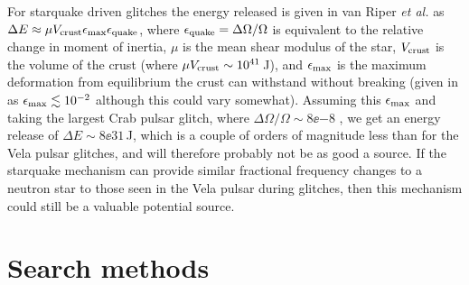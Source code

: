 For starquake driven glitches the energy released is given in van Riper {\it et al.}
\cite{vanRiper:1991} as $\Delta{}E \approx \mu{}V_{\rm crust}\epsilon_{\rm max}\epsilon_{\rm
quake}$, where $\epsilon_{\rm quake} = \Delta\Omega/\Omega$ is equivalent to the relative change in
moment of inertia, $\mu$ is the mean shear modulus of the star, $V_{\rm crust}$ is the volume of the
crust (where $\mu{}V_{\rm crust} \sim 10^{41}$\,J), and $\epsilon_{\rm max}$ is the maximum
deformation from equilibrium the crust can withstand without breaking (given in \cite{vanRiper:1991}
as $\epsilon_{\rm max} \lesssim 10^{-2}$ although this could vary somewhat). Assuming this
$\epsilon_{\rm max}$ and taking the largest Crab pulsar glitch, where $\Delta\Omega/\Omega \sim
8\ee{-8}$ \cite{Lyne:1993}, we get an energy release of $\Delta{}E \sim 8\ee{31}$\,J, which is
a couple of orders of magnitude less than for the Vela pulsar glitches, and will therefore probably
not be as good a \gw source. If the starquake mechanism can provide similar fractional frequency
changes to a neutron star to those seen in the Vela pulsar during glitches, then this mechanism
could still be a valuable potential source.

\section{Search methods}
